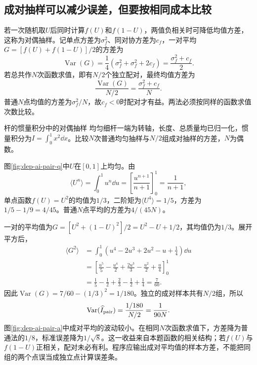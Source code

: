 \subsection{成对抽样可以减少误差，但要按相同成本比较}
若一次随机取$U$后同时计算$f(U)$和$f(1-U)$，两值负相关时可降低均值方差，这称为对偶抽样。记单点方差为$\sigma_f^2$、同对协方差为$c_f$，一对平均$G=[f(U)+f(1-U)]/2$的方差为
\[\operatorname{Var}(G)=\frac14(\sigma_f^2+\sigma_f^2+2c_f)
=\frac{\sigma_f^2+c_f}{2}.\]
若总共作$N$次函数求值，即有$N/2$个独立配对，最终均值方差为
\[\frac{\operatorname{Var}(G)}{N/2}=\frac{\sigma_f^2+c_f}{N}.\]
普通$N$点均值的方差为$\sigma_f^2/N$，故$c_f<0$时配对才有益。两法必须按同样的函数求值次数比较。

\begin{example}杆的惯量积分中的对偶抽样
均匀细杆一端为转轴，长度、总质量均已归一化，惯量积分为$I=\int_0^1x^2\dd x$。比较$N$次普通均匀抽样与$N/2$组成对抽样的方差，$N$为偶数。
\end{example}
\begin{solution}
图\ref{fig:dep-ai-pair-q}中$U$在$[0,1]$上均匀。由
\[\langle U^n\rangle=\int_0^1u^n\dd u
=\left[\frac{u^{n+1}}{n+1}\right]_0^1=\frac1{n+1},\]
单点函数$f(U)=U^2$的均值为$1/3$，二阶矩为$\langle U^4\rangle=1/5$，方差为$1/5-1/9=4/45$。普通$N$点平均的方差为$4/(45N)$。

一对的平均值为$G=[U^2+(1-U)^2]/2=U^2-U+1/2$，其均值仍为$1/3$。展开平方后，
\[
\begin{aligned}
\langle G^2\rangle&=\int_0^1\left(u^4-2u^3+2u^2-u+\frac14\right)\dd u\\
&=\left[\frac{u^5}{5}-\frac{u^4}{2}+\frac{2u^3}{3}-\frac{u^2}{2}+\frac u4\right]_0^1\\
&=\frac15-\frac12+\frac23-\frac12+\frac14=\frac7{60}.
\end{aligned}
\]
因此$\operatorname{Var}(G)=7/60-(1/3)^2=1/180$。独立的成对样本共有$N/2$组，所以
\[
 \operatorname{Var}(\widehat I_{\rm pair})=\frac{1/180}{N/2}
 =\frac1{90N}.
\]
图\ref{fig:dep-ai-pair-a}中成对平均的波动较小。在相同$N$次函数求值下，方差降为普通法的$1/8$，标准误差降为$1/\sqrt8$。这一收益来自本题函数的相关结构；若$f(U)$与$f(1-U)$正相关，配对未必有利。程序应输出成对平均值的样本方差，不能把同组的两个点误当成独立点计算误差条。
\end{solution}

